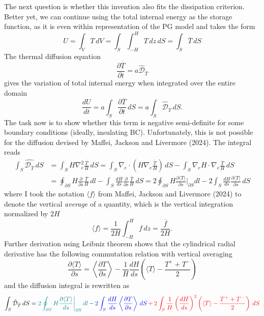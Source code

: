 The next question is whether this invention also fits the dissipation criterion. 
Better yet, we can continue using the total internal energy as the storage function, as it is even within representation of the PG model and takes the form
\begin{equation}
    U = \int_V T \, dV = \int_S \int_{-H}^H T \, dz \, dS = \int_S \overline{T} \, dS
\end{equation}
The thermal diffusion equation
\[
    \frac{\partial \overline{T}}{\partial t} = a \hat{\mathcal{D}}_{\overline{T}}
\]
gives the variation of total internal energy when integrated over the entire domain
\[
    \frac{dU}{dt} = a \int_S \frac{\partial \overline{T}}{\partial t} \, dS = a \int_S \hat{\mathcal{D}}_{\overline{T}} \, dS.
\]
The task now is to show whether this term is negative semi-definite for some boundary conditions (ideally, insulating BC). Unfortunately, this is not possible for the diffusion devised by Maffei, Jackson and Livermore (2024). The integral reads
\[\begin{aligned}
    \int_S \hat{\mathcal{D}_{\overline{T}}} \, dS &= \int_S H \nabla_e^2 \frac{\overline{T}}{H} \, dS = \int_S \nabla_e \cdot \left(H \nabla_e \frac{\overline{T}}{H}\right) \, dS - \int_S \nabla_e H \cdot \nabla_e \frac{\overline{T}}{H} \, dS \\ 
    &= \oint_{\partial S} H \frac{\partial}{\partial s} \frac{\overline{T}}{H} \, dl - \int_{S} \frac{dH}{ds} \frac{\partial}{\partial s} \frac{\overline{T}}{H} \, dS 
    = 2\oint_{\partial S} H \frac{\partial \langle T \rangle}{\partial s} \bigg|_{\partial S} dl - 2\int_{S} \frac{dH}{ds} \frac{\partial \langle T \rangle}{\partial s} \, dS
\end{aligned}\]
where I took the notation $\langle f \rangle$ from Maffei, Jackson and Livermore (2024) to denote the vertical \textit{average} of a quantity, which is the vertical integration normalized by $2H$
\[
    \langle f \rangle = \frac{1}{2H} \int_{-H}^H f \, dz = \frac{\overline{f}}{2H}.
\]
Further derivation using Leibniz theorem shows that the cylindrical radial derivative has the following commutation relation with vertical averaging
\[
    \frac{\partial \langle T \rangle}{\partial s} = \left\langle \frac{\partial T}{\partial s} \right\rangle - \frac{1}{H} \frac{dH}{ds} \left(\langle T \rangle - \frac{T^+ + T^-}{2}\right)
\]
and the diffusion integral is rewritten as 
\begin{equation}
    \int_S \hat{\mathcal{D}}_{\bar{T}} \, dS = 
    \textcolor{teal}{2 \oint_{\partial S} H \frac{\partial \langle T \rangle}{ds} \bigg|_{\partial S} \, dl} 
    \textcolor{blue}{\,-\, 2 \int_S \frac{dH}{ds} \left\langle \frac{\partial T}{\partial s} \right\rangle \, dS} 
    \textcolor{red}{\,+\, 2 \int_S \frac{1}{H} \left(\frac{dH}{ds}\right)^2 \left(\langle T \rangle - \frac{T^+ + T^-}{2}\right) \, dS}
\end{equation}
